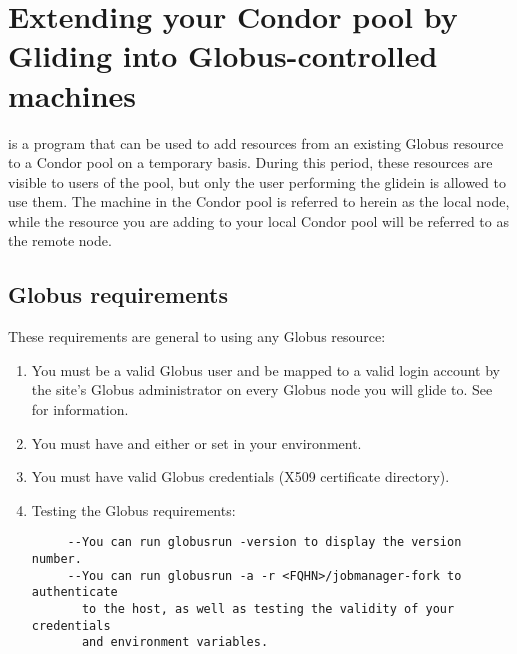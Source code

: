 \section{\label{sec:Glidein}Extending your Condor pool by Gliding into Globus-controlled machines}

 is a program that can be used to add resources from an
existing Globus resource to a Condor 
pool on a temporary basis. During this period, these resources are visible 
to users of the pool, but only the user performing the glidein is allowed 
to use them. The machine in the Condor pool is referred to herein as the
local node, while the resource you are adding to your local Condor pool
will be referred to as the remote node.

\subsection{Globus requirements}
These requirements are general to using any Globus resource:
\begin{enumerate}

\item You must be a valid Globus user and be mapped to a valid login account by
the site's Globus administrator on every Globus node you will glide to.
See  for information.

\item You must have  and either  or 
 set in your environment.

\item You must have valid Globus credentials (X509 certificate directory).

\item Testing the Globus requirements:
\begin{verbatim}
     --You can run globusrun -version to display the version number.
     --You can run globusrun -a -r <FQHN>/jobmanager-fork to authenticate 
       to the host, as well as testing the validity of your credentials 
       and environment variables.
\end{verbatim}
\end{enumerate}

